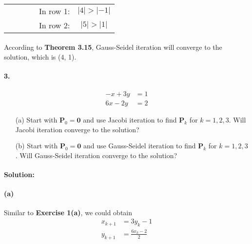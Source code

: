 \documentclass{article}  %
\begin{document}
        \paragraph{}
        \renewcommand\tabcolsep{12.0pt} %
        \begin{threeparttable} %
            \begin{tabular}{cccccc} 
             & & & & In row 1: & $|4| > |-1|$ \\
             & & & & In row 2: & $|5| > |1|$
            \end{tabular} 
        \end{threeparttable}
        \paragraph{}According to \textbf{Theorem 3.15}, Gauss-Seidel iteration will converge to the solution, which is (4, 1).
        \paragraph{3.}
        \begin{align*}
            -x + 3y &= 1 \\
            6x - 2y &= 2
        \end{align*}
        \begin{enumerate}
            \item[(a)] 
            Start with $\bm{P}_0 = \bm{0}$ and use Jacobi iteration to find $\bm{P}_k$ for $k = 1, 2, 3$. Will Jacobi iteration converge to the solution?
            \item[(b)]
            Start with $\bm{P}_0 = \bm{0}$ and use Gauss-Seidel iteration to find $\bm{P}_k$ for $k = 1, 2, 3$. Will Gauss-Seidel iteration converge to the solution?
        \end{enumerate}
        \paragraph{Solution:}
        \paragraph{(a)}Similar to \textbf{Exercise 1(a)}, we could obtain 
        \begin{align*}
            x_{k+1} &= 3y_k - 1 \\
            y_{k+1} &= \frac{6x_k - 2}{2}
        \end{align*}
\end{document}

